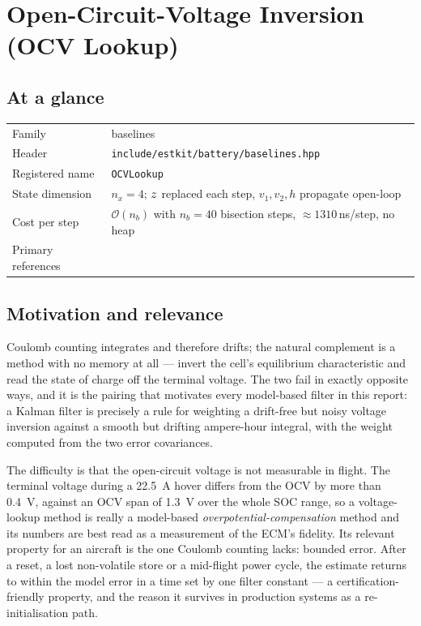 \chapter{Open-Circuit-Voltage Inversion (OCV Lookup)}
\label{ch:ocvlookup}

\section*{At a glance}
\begin{tabular}{@{}l>{\raggedright\arraybackslash}p{}@{}}
Family & baselines \\
Header & \texttt{include/estkit/battery/baselines.hpp} \\
Registered name & \texttt{OCVLookup} \\
State dimension & $n_x = 4$; $z$ replaced each step, $v_1,v_2,h$ propagate open-loop \\
Cost per step & $\mathcal{O}(n_b)$ with $n_b=40$ bisection steps, $\approx 1310$\,ns/step, no heap \\
Primary references & \cite{plett2015bms1,weng2014ocv,hu2012comparative} \\
\end{tabular}

\section{Motivation and relevance}
Coulomb counting integrates and therefore drifts; the natural complement is a method with no memory
at all --- invert the cell's equilibrium characteristic and read the state of charge off the
terminal voltage. The two fail in exactly opposite ways, and it is the pairing that motivates every
model-based filter in this report: a Kalman filter is precisely a rule for weighting a drift-free
but noisy voltage inversion against a smooth but drifting ampere-hour integral, with the weight
computed from the two error covariances.

The difficulty is that the open-circuit voltage is not measurable in flight. The terminal voltage
during a \SI{22.5}{\ampere} hover differs from the OCV by more than \SI{0.4}{\volt}, against an OCV
span of \SI{1.3}{\volt} over the whole SOC range, so a voltage-lookup method is really a model-based
\emph{overpotential-compensation} method and its numbers are best read as a measurement of the
ECM's fidelity. Its relevant property for an aircraft is the one Coulomb counting lacks: bounded
error. After a reset, a lost non-volatile store or a mid-flight power cycle, the estimate returns to
within the model error in a time set by one filter constant --- a certification-friendly property,
and the reason it survives in production systems as a re-initialisation path.

